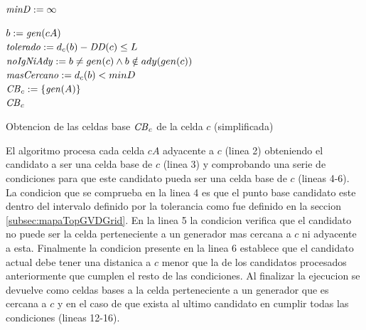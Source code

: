 \begin{algorithm}[H]
\SetAlgoLined


  $\mathit{minD} := \infty$

   {
    $b := \mathit{gen}(cA)$\\
    $\mathit{tolerado} := d_c(b) - \mathit{DD}(c) \leq L$\\
    $\mathit{noIgNiAdy} := b \neq gen(c) \land b \notin ady(gen(c))$\\
    $\mathit{masCercano} := d_c(b) < minD$\\
  }
  $\mathit{CB}_c := \{\mathit{gen}(A)\}$\\
  \Return $\mathit{CB}_c$ 

  \caption{Obtencion de las celdas base $\mathit{CB}_c$ de la celda $c$ (simplificada)}
  \label{alg:celdasBase}
\end{algorithm}

El algoritmo procesa cada celda $cA$ adyacente a $c$ (linea 2) obteniendo el
candidato a ser una celda base de $c$ (linea 3) y comprobando una serie de
condiciones para que este candidato pueda ser una celda base de $c$ (lineas
4-6). La condicion que se comprueba en la linea 4 es que el punto base
candidato este dentro del intervalo definido por la tolerancia como fue
definido en la seccion \ref{subsec:mapaTopGVDGrid}. En la linea 5 la condicion
verifica que el candidato no puede ser la celda perteneciente a un generador
mas cercana a $c$ ni adyacente a esta. Finalmente la condicion presente en la
linea 6 establece que el candidato actual debe tener una distanica a $c$ menor
que la de los candidatos procesados anteriormente que cumplen el resto de las
condiciones. Al finalizar la ejecucion se devuelve como celdas bases a la celda
perteneciente a un generador que es cercana a $c$ y en el caso de que exista al
ultimo candidato en cumplir todas las condiciones (lineas 12-16).


